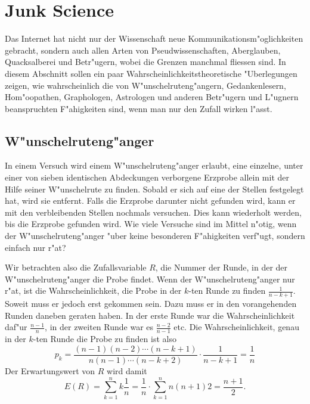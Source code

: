 %
%
%
\chapter{Junk Science}
Das Internet hat nicht nur der Wissenschaft neue Kommunikationsm"oglichkeiten
gebracht, sondern auch allen Arten von Pseudwissenschaften,
Aberglauben, Quacksalberei und Betr"ugern, wobei die Grenzen manchmal
fliessen sind. In diesem Abschnitt sollen ein paar Wahrscheinlichkeitstheoretische
"Uberlegungen zeigen, wie wahrscheinlich die von W"unschelruteng"angern,
Gedankenlesern, Hom"oo\-pathen, Graphologen, Astrologen und anderen Betr"ugern
und L"ugnern beanspruchten F"ahigkeiten sind, wenn man nur den Zufall wirken
l"asst.

\section{W"unschelruteng"anger}
In einem Versuch wird einem W"unschelruteng"anger erlaubt, eine einzelne,
unter einer von sieben identischen Abdeckungen verborgene Erzprobe allein
mit der Hilfe seiner W"unschelrute zu finden. Sobald er sich auf eine
der Stellen festgelegt hat, wird sie entfernt. Falls die Erzprobe darunter
nicht gefunden wird, kann er mit den verbleibenden Stellen nochmals
versuchen. Dies kann wiederholt werden, bis die Erzprobe gefunden wird.
Wie viele Versuche sind im Mittel n"otig, wenn der W"unschelruteng"anger
"uber keine besonderen F"ahigkeiten verf"ugt, sondern einfach nur r"at?

Wir betrachten also die Zufallsvariable $R$, die Nummer der Runde, in der
der W"unschelruteng"anger die Probe findet. Wenn der W"unschelruteng"anger
nur r"at, ist die Wahrscheinlichkeit, die Probe in der $k$-ten Runde zu finden
$\frac1{n-k+1}$. Soweit muss er jedoch erst gekommen sein. Dazu muss er in
den vorangehenden Runden daneben geraten haben. In der erste
Runde war die Wahrscheinlichkeit daf"ur $\frac{n-1}n$, in der zweiten
Runde war es $\frac{n-2}{n-1}$ etc. Die Wahrscheinlichkeit, genau in der
$k$-ten Runde die Probe zu finden ist also
$$p_k=\frac{(n-1)(n-2)\cdots (n-k+1)}{n(n-1)\cdots(n-k+2)}\cdot\frac1{n-k+1}=\frac1n$$
Der Erwartungswert von $R$ wird damit
$$E(R)=\sum_{k=1}^nk\frac1n=\frac1n\cdot\sum_{k=1}^n{n(n+1)}2=\frac{n+1}2.$$

